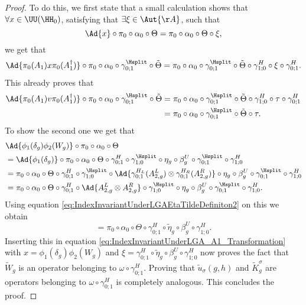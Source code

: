 \begin{proof}
	To do this, we first state that a small calculation shows that $\forall x\in\UU(\HH_0)$, satisfying that $\exists\xi\in\Aut{\AA}$, such that
	\begin{equation}
		\Ad{x}\circ\pi_0\circ\alpha_0\circ\Theta=\pi_0\circ\alpha_0\circ\Theta\circ\xi,
	\end{equation}
	we get that
	\begin{equation}\label{eq:IndexInvariantUnderLGA_A1_Transformation}
		\Ad{\pi_0(A_1)x\pi_0(A_1^\dagger)}\circ\pi_0\circ\alpha_0\circ\gamma^{\Hsplit}_{0;1}\circ\tilde{\Theta}=\pi_0\circ\alpha_0\circ\gamma^{\Hsplit}_{0;1}\circ\tilde{\Theta}\circ\gamma^H_{1;0}\circ\xi\circ\gamma^H_{0;1}.
	\end{equation}
	This already proves that
	\begin{align}
		\Ad{\pi_0(A_1)v\pi_0(A_1^\dagger)}\circ\pi_0\circ\alpha_0\circ\gamma^{\Hsplit}_{0;1}\circ\tilde{\Theta}&=\pi_0\circ\alpha_0\circ\gamma^{\Hsplit}_{0;1}\circ\tilde{\Theta}\circ\gamma^H_{1;0}\circ\tau\circ\gamma^H_{0;1}\\
		&=\pi_0\circ\alpha_0\circ\gamma^{\Hsplit}_{0;1}\circ\tilde{\Theta}\circ\tau.
	\end{align}
	To show the second one we get that
	\begin{align}
		&\Ad{\phi_1(\delta_g)\phi_2(W_g)}\circ\pi_0\circ\alpha_0\circ\Theta\\
		&=\Ad{\phi_1(\delta_g)}\circ\pi_0\circ\alpha_0\circ\Theta\circ\gamma^{H}_{0;1}\circ\gamma^{\Hsplit}_{1;0}\circ\eta_g\circ\beta_g^U\circ\gamma^{\Hsplit}_{0;1}\circ\gamma^H_{1;0}\\
		&=\pi_0\circ\alpha_0\circ\Theta\circ\gamma^{H}_{0;1}\circ\gamma^{\Hsplit}_{1;0}\circ\Ad{\gamma^{H_L}_{0;1}(A_{2,g}^L)\otimes\gamma^{H_R}_{0;1}(A_{2,g}^R)}\circ\eta_g\circ\beta_g^U\circ\gamma^{\Hsplit}_{0;1}\circ\gamma^H_{1;0}\\
		&=\pi_0\circ\alpha_0\circ\Theta\circ\gamma^{H}_{0;1}\circ\Ad{A_{2,g}^L\otimes A_{2,g}^R}\circ\gamma^{\Hsplit}_{1;0}\circ\eta_g\circ\beta_g^U\circ\gamma^{\Hsplit}_{0;1}\circ\gamma^H_{1;0}.
	\end{align}
	Using equation \eqref{eq:IndexInvariantUnderLGAEtaTildeDefiniton2} on this we obtain
	\begin{equation}
		=\pi_0\circ\alpha_0\circ\Theta\circ\gamma^H_{0;1}\circ\tilde{\eta}_g\circ\beta_g^U\circ\gamma^H_{1;0}.
	\end{equation}
	Inserting this in equation \eqref{eq:IndexInvariantUnderLGA_A1_Transformation} with $x=\phi_1(\delta_g)\phi_2(W_g)$ and $\xi=\gamma^H_{0;1}\circ\tilde{\eta}_g\circ\beta_g^U\circ\gamma^H_{1;0}$ now proves the fact that $\tilde{W}_g$ is an operator belonging to $\omega\circ\gamma^H_{0;1}$. Proving that $\tilde u_\sigma(g,h)$ and $\tilde{K}_g^\sigma$ are operators belonging to $\omega\circ\gamma_{0;1}^H$ is completely analogous. This concludes the proof.
\end{proof}
